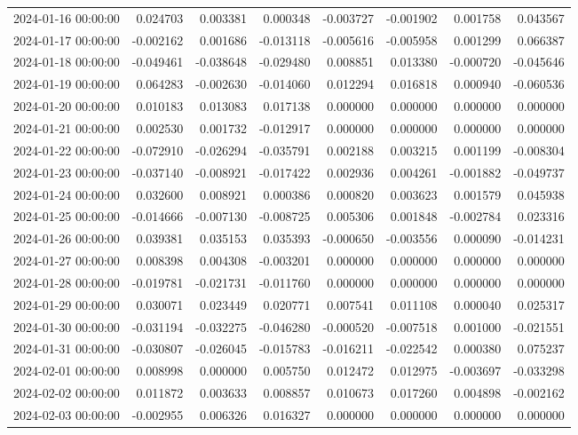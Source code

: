 \begin{tabular}{lrrrrrrr}
2024-01-16 00:00:00 & 0.024703 & 0.003381 & 0.000348 & -0.003727 & -0.001902 & 0.001758 & 0.043567 \\
2024-01-17 00:00:00 & -0.002162 & 0.001686 & -0.013118 & -0.005616 & -0.005958 & 0.001299 & 0.066387 \\
2024-01-18 00:00:00 & -0.049461 & -0.038648 & -0.029480 & 0.008851 & 0.013380 & -0.000720 & -0.045646 \\
2024-01-19 00:00:00 & 0.064283 & -0.002630 & -0.014060 & 0.012294 & 0.016818 & 0.000940 & -0.060536 \\
2024-01-20 00:00:00 & 0.010183 & 0.013083 & 0.017138 & 0.000000 & 0.000000 & 0.000000 & 0.000000 \\
2024-01-21 00:00:00 & 0.002530 & 0.001732 & -0.012917 & 0.000000 & 0.000000 & 0.000000 & 0.000000 \\
2024-01-22 00:00:00 & -0.072910 & -0.026294 & -0.035791 & 0.002188 & 0.003215 & 0.001199 & -0.008304 \\
2024-01-23 00:00:00 & -0.037140 & -0.008921 & -0.017422 & 0.002936 & 0.004261 & -0.001882 & -0.049737 \\
2024-01-24 00:00:00 & 0.032600 & 0.008921 & 0.000386 & 0.000820 & 0.003623 & 0.001579 & 0.045938 \\
2024-01-25 00:00:00 & -0.014666 & -0.007130 & -0.008725 & 0.005306 & 0.001848 & -0.002784 & 0.023316 \\
2024-01-26 00:00:00 & 0.039381 & 0.035153 & 0.035393 & -0.000650 & -0.003556 & 0.000090 & -0.014231 \\
2024-01-27 00:00:00 & 0.008398 & 0.004308 & -0.003201 & 0.000000 & 0.000000 & 0.000000 & 0.000000 \\
2024-01-28 00:00:00 & -0.019781 & -0.021731 & -0.011760 & 0.000000 & 0.000000 & 0.000000 & 0.000000 \\
2024-01-29 00:00:00 & 0.030071 & 0.023449 & 0.020771 & 0.007541 & 0.011108 & 0.000040 & 0.025317 \\
2024-01-30 00:00:00 & -0.031194 & -0.032275 & -0.046280 & -0.000520 & -0.007518 & 0.001000 & -0.021551 \\
2024-01-31 00:00:00 & -0.030807 & -0.026045 & -0.015783 & -0.016211 & -0.022542 & 0.000380 & 0.075237 \\
2024-02-01 00:00:00 & 0.008998 & 0.000000 & 0.005750 & 0.012472 & 0.012975 & -0.003697 & -0.033298 \\
2024-02-02 00:00:00 & 0.011872 & 0.003633 & 0.008857 & 0.010673 & 0.017260 & 0.004898 & -0.002162 \\
2024-02-03 00:00:00 & -0.002955 & 0.006326 & 0.016327 & 0.000000 & 0.000000 & 0.000000 & 0.000000 \\

\end{tabular}
